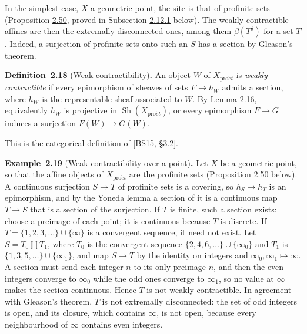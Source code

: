 \documentclass[11pt]{article}
\newenvironment{bpstatement}[2]{\par\addvspace{0.6\baselineskip}\noindent\textbf{#1}#2\textbf{.}\enspace\ignorespaces}
  {\par\addvspace{0.4\baselineskip}}
\providecommand{\Sh}{}\renewcommand{\Sh}{\operatorname{Sh}}
\begin{document}
In the simplest case, \(X\) a geometric point, the site is that of profinite sets (Proposition \hyperref[bp151]{2.50}, proved in Subsection \hyperref[bp149]{2.12.1} below). The weakly contractible affines are then the extremally disconnected ones, among them \(\beta(T^\delta)\) for a set \(T\). Indeed, a surjection of profinite sets onto such an \(S\) has a section by Gleason's theorem.

\label{bp53}%
\begin{bpstatement}{Definition~2.18}{ (Weak contractibility)}
An object \(W\) of \(X_{\mathrm{pro}\acute{e}t}\) is \emph{weakly contractible} if every epimorphism of sheaves of sets \(F\to h_W\) admits a section, where \(h_W\) is the representable sheaf associated to \(W\). By Lemma \hyperref[bp47]{2.16}, equivalently \(h_W\) is projective in \(\Sh(X_{\mathrm{pro}\acute{e}t})\), or every epimorphism \(F\to G\) induces a surjection \(F(W)\to G(W)\).
\end{bpstatement}

\label{bp54}%
This is the categorical definition of [\hyperref[bp191]{BS15}, §3.2].

\label{bp55}%
\begin{bpstatement}{Example~2.19}{ (Weak contractibility over a point)}
Let \(X\) be a geometric point, so that the affine objects of \(X_{\mathrm{pro}\acute{e}t}\) are the profinite sets (Proposition \hyperref[bp151]{2.50} below). A continuous surjection \(S\to T\) of profinite sets is a covering, so \(h_S\to h_T\) is an epimorphism, and by the Yoneda lemma a section of it is a continuous map \(T\to S\) that is a section of the surjection. If \(T\) is finite, such a section exists: choose a preimage of each point; it is continuous because \(T\) is discrete. If \(T=\{1,2,3,\ldots\}\cup\{\infty\}\) is a convergent sequence, it need not exist. Let \(S=T_0\amalg T_1\), where \(T_0\) is the convergent sequence \(\{2,4,6,\ldots\}\cup\{\infty_0\}\) and \(T_1\) is \(\{1,3,5,\ldots\}\cup\{\infty_1\}\), and map \(S\to T\) by the identity on integers and \(\infty_0,\infty_1\mapsto\infty\). A section must send each integer \(n\) to its only preimage \(n\), and then the even integers converge to \(\infty_0\) while the odd ones converge to \(\infty_1\), so no value at \(\infty\) makes the section continuous. Hence \(T\) is not weakly contractible. In agreement with Gleason's theorem, \(T\) is not extremally disconnected: the set of odd integers is open, and its closure, which contains \(\infty\), is not open, because every neighbourhood of \(\infty\) contains even integers.
\end{bpstatement}
\end{document}
